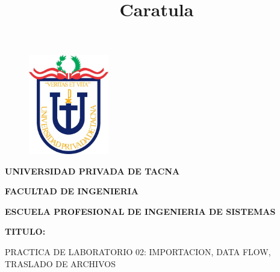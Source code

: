 \documentclass[12pt,letterpaper]{article}
\begin{document}
%

  
\title{Caratula}

\begin{titlepage}
    \begin{center}
    \begin{figure}[htb]
    \begin{center}
    \includegraphics[width=3.5cm]{./img/upt.jpg}
    \end{center}
    \end{figure}
    
    \vspace*{0.15in}
    \begin{Large}
    \textbf{UNIVERSIDAD PRIVADA DE TACNA}\\
    \end{Large}
    
    \vspace*{0.1in}
    \begin{Large}
    \textbf{FACULTAD DE INGENIERIA} \\
    \end{Large}
    
    \vspace*{0.1in}
    \begin{Large}
    \textbf{ESCUELA PROFESIONAL DE INGENIERIA DE SISTEMAS} \\
    \end{Large}
    
    \vspace*{0.5in}
    \begin{Large}
    \textbf{TITULO:}\\
    \end{Large}
    

\vspace*{0.1in}
\begin{Large}
    PRACTICA DE LABORATORIO 02: IMPORTACION, DATA FLOW, TRASLADO DE ARCHIVOS \\
\end{Large}


\end{center}
\end{titlepage}
\end{document}
